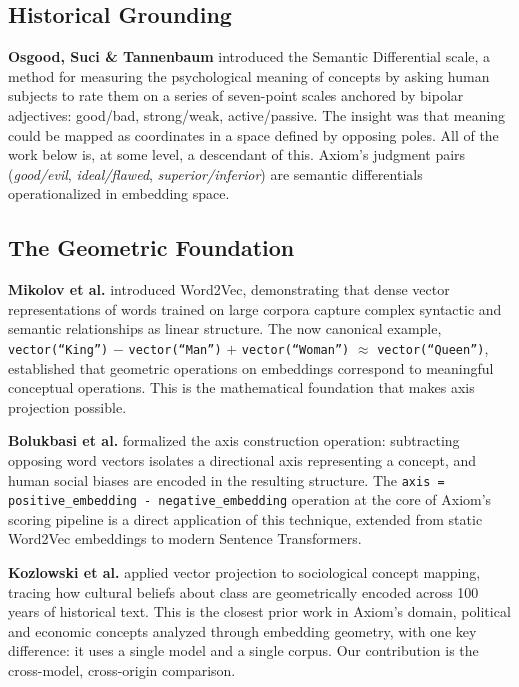 \documentclass[11pt, letterpaper]{article}
\begin{document}
\subsection{Historical Grounding}

\textbf{Osgood, Suci \& Tannenbaum} \cite{osgood1957} introduced the Semantic Differential scale, a method for measuring the psychological meaning of concepts by asking human subjects to rate them on a series of seven-point scales anchored by bipolar adjectives: good/bad, strong/weak, active/passive. The insight was that meaning could be mapped as coordinates in a space defined by opposing poles. All of the work below is, at some level, a descendant of this. Axiom's judgment pairs (\textit{good/evil}, \textit{ideal/flawed}, \textit{superior/inferior}) are semantic differentials operationalized in embedding space.

\subsection{The Geometric Foundation}

\textbf{Mikolov et al.} \cite{mikolov2013} introduced Word2Vec, demonstrating that dense vector representations of words trained on large corpora capture complex syntactic and semantic relationships as linear structure. The now canonical example, \texttt{vector(``King'')} $-$ \texttt{vector(``Man'')} $+$ \texttt{vector(``Woman'')} $\approx$ \texttt{vector(``Queen'')}, established that geometric operations on embeddings correspond to meaningful conceptual operations. This is the mathematical foundation that makes axis projection possible.

\textbf{Bolukbasi et al.} \cite{bolukbasi2016} formalized the axis construction operation: subtracting opposing word vectors isolates a directional axis representing a concept, and human social biases are encoded in the resulting structure. The \texttt{axis = positive\_embedding - negative\_embedding} operation at the core of Axiom's scoring pipeline is a direct application of this technique, extended from static Word2Vec embeddings to modern Sentence Transformers.

\textbf{Kozlowski et al.} \cite{kozlowski2019} applied vector projection to sociological concept mapping, tracing how cultural beliefs about class are geometrically encoded across 100 years of historical text. This is the closest prior work in Axiom's domain, political and economic concepts analyzed through embedding geometry, with one key difference: it uses a single model and a single corpus. Our contribution is the cross-model, cross-origin comparison.
\end{document}
